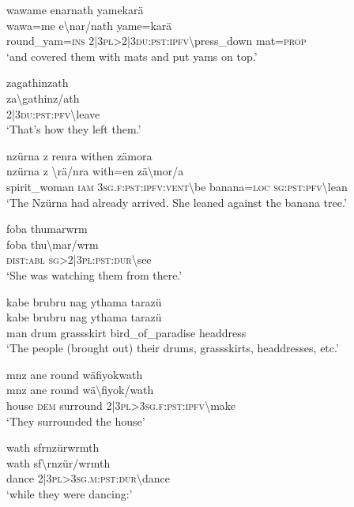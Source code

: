 \ea\label{ex:6:a1265}
wawame enarnath yamekarä\\
\gll wawa=me	e{\textbackslash}nar/nath	yame=karä\\
     round\_yam=\textsc{ins}	2|3\textsc{pl}>2|3\textsc{du}:\textsc{pst}:\textsc{ipfv}{\textbackslash}press\_down	mat=\textsc{prop}\\
\glt `and covered them with mats and put yams on top.'
\z

\ea\label{ex:6:a1266}
zagathinzath\\
\gll za{\textbackslash}gathinz/ath\\
     2|3\textsc{du}:\textsc{pst}:\textsc{pfv}{\textbackslash}leave\\
\glt `That's how they left them.'
\z

\ea\label{ex:6:a1267}
nzürna z renra withen zämora\\
\gll nzürna	z	{\textbackslash}rä/nra	with=en	zä{\textbackslash}mor/a\\
     spirit\_woman	\textsc{iam}	3\textsc{sg}.\textsc{f}:\textsc{pst}:\textsc{ipfv}:\textsc{vent}{\textbackslash}be	banana=\textsc{loc}	\textsc{sg}:\textsc{pst}:\textsc{pfv}{\textbackslash}lean\\
\glt `The Nzürna had already arrived. She leaned against the banana tree.'
\z

\ea\label{ex:6:a1268}
foba thumarwrm\\
\gll foba	thu{\textbackslash}mar/wrm\\
     \textsc{dist}:\textsc{abl}	\textsc{sg}>2|3\textsc{pl}:\textsc{pst}:\textsc{dur}{\textbackslash}see\\
\glt `She was watching them from there.'
\z

\ea\label{ex:6:a1269}
kabe brubru nag ythama tarazü\\
\gll kabe	brubru	nag	ythama	tarazü\\
     man	drum	grassskirt	bird\_of\_paradise	headdress\\
\glt `The people (brought out) their drums, grassskirts, headdresses, etc.'
\z

\ea\label{ex:6:a1272}
mnz ane round wäfiyokwath\\
\gll mnz	ane	round	wä{\textbackslash}fiyok/wath\\
     house	\textsc{dem}	surround	2|3\textsc{pl}>3\textsc{sg}.\textsc{f}:\textsc{pst}:\textsc{ipfv}{\textbackslash}make\\
\glt `They surrounded the house'
\z

\ea\label{ex:6:a1273}
wath sfrnzürwrmth\\
\gll wath	sf{\textbackslash}rnzür/wrmth\\
     dance	2|3\textsc{pl}>3\textsc{sg}.\textsc{m}:\textsc{pst}:\textsc{dur}{\textbackslash}dance\\
\glt `while they were dancing:'
\z

